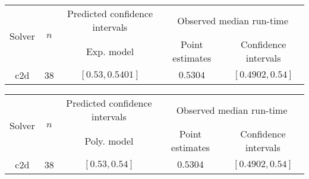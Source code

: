 \begin{tabular}{ccccc}
\hline 
\multirow{2}{*}{Solver} & \multirow{2}{*}{$n$} & Predicted confidence intervals & \multicolumn{2}{c}{Observed median  run-time}\tabularnewline
 &  & Exp. model  & Point estimates  & Confidence intervals\tabularnewline
\hline 
\hline 
\multirow{0}{*}{c2d} & 38 & $\mathbf{\left[0.53,0.5401\right]}$ & $0.5304$ & $\left[0.4902,0.54\right]$ \tabularnewline 
\hline 
\end{tabular} 

\begin{tabular}{ccccc}
\hline 
\multirow{2}{*}{Solver} & \multirow{2}{*}{$n$} & Predicted confidence intervals & \multicolumn{2}{c}{Observed median  run-time}\tabularnewline
 &  & Poly. model  & Point estimates  & Confidence intervals\tabularnewline
\hline 
\hline 
\multirow{0}{*}{c2d} & 38 & $\mathbf{\left[0.53,0.54\right]}$ & $0.5304$ & $\left[0.4902,0.54\right]$ \tabularnewline 
\hline 
\end{tabular} 


